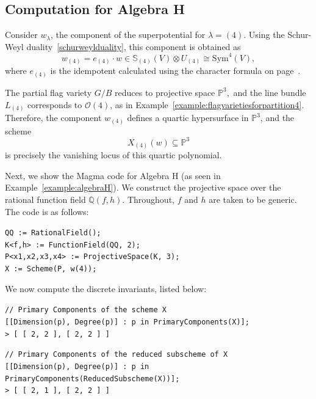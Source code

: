 \documentclass{amsart}
\begin{document}
\subsection{Computation for Algebra H}
\begin{example}\label{discrete-inv-4-algH}
Consider \(w_\lambda\), the component of the superpotential for \(\lambda = (4)\). Using the Schur-Weyl duality~\ref{schurweylduality}, this component is obtained as
\[
w_{(4)} = e_{(4)} \cdot w \in \mathbb{S}_{(4)}(V) \otimes U_{(4)} \cong \mathrm{Sym}^4(V),
\]
where $e_{(4)}$ is the idempotent calculated using the character formula on page~\pageref{eqchformula}.

The partial flag variety \( G/B \) reduces to projective space $\mathbb{P}^3,$
and the line bundle \( L_{(4)} \) corresponds to \( \mathcal{O}(4) \), as in Example~\ref{example:flagvarietiesforpartition4}. Therefore, the component \( w_{(4)} \) defines a quartic hypersurface in \( \mathbb{P}^3 \), and the scheme
\[
X_{(4)}(w) \subseteq \mathbb{P}^3
\]
is precisely the vanishing locus of this quartic polynomial.

Next, we show the Magma code for Algebra H (as seen in Example~\ref{example:algebraH}). We construct the projective space over the rational function field $\mathbb{Q}(f,h)$. Throughout, $f$ and $h$ are taken to be generic. The code is as follows:

\begin{flushleft}
\texttt{QQ := RationalField();} \\
\texttt{K<f,h> := FunctionField(QQ, 2);} \\
\texttt{P<x1,x2,x3,x4> := ProjectiveSpace(K, 3);} \\
\texttt{X := Scheme(P, w(4));}
\end{flushleft}


We now compute the discrete invariants, listed below:
\begin{flushleft}
\texttt{// Primary Components of the scheme X } \\
\texttt{[[Dimension(p), Degree(p)] : p in PrimaryComponents(X)];}\\
\texttt{> [ [ 2, 2 ], [ 2, 2 ] ]}
\end{flushleft}


\begin{flushleft}
\texttt{// Primary Components of the reduced subscheme of X} \\
\texttt{[[Dimension(p), Degree(p)] : p in PrimaryComponents(ReducedSubscheme(X))];}\\
\texttt{> [ [ 2, 1 ], [ 2, 2 ] ]}
\end{flushleft}



\end{example}
\end{document}
